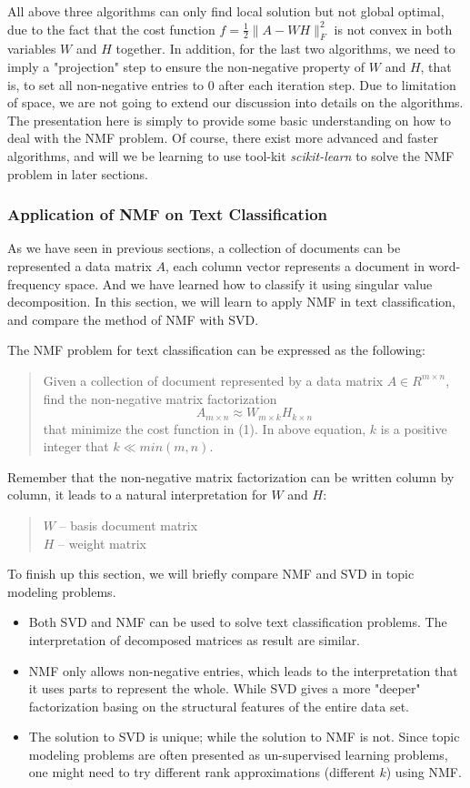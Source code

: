 \documentclass[12pt,letterpaper]{article}
\begin{document}
All above three algorithms can only find local solution but not global optimal, due to the fact that the cost function $f = \frac{1}{2} \|A - WH\|_F^2$ is not convex in both variables $W$ and $H$ together. In addition, for the last two algorithms, we need to imply a "projection" step to ensure the non-negative property of $W$ and $H$, that is, to set all non-negative entries to 0 after each iteration step. Due to limitation of space, we are not going to extend our discussion into details on the algorithms. The presentation here is simply to provide some basic understanding on how to deal with the NMF problem. Of course, there exist more advanced and faster algorithms, and will we be learning to use tool-kit \textit{scikit-learn} to solve the NMF problem in later sections. 
\subsubsection{Application of NMF on Text Classification}
As we have seen in previous sections, a collection of documents can be represented a data matrix $A$, each column vector represents a document in word-frequency space. And we have learned how to classify it using singular value decomposition. In this section, we will learn to apply NMF in text classification, and compare the method of NMF with SVD. 

The NMF problem for text classification can be expressed as the following: 
\begin{quotation}
	\noindent Given a collection of document represented by a data matrix $A \in R^{m\times n}$, find the non-negative matrix factorization
	\begin{equation}
	A_{m\times n} \approx W_{m\times k} H_{k\times n}
	\end{equation}
	that minimize the cost function in (1). In above equation, $k$ is a positive integer that $k \ll min(m, n)$. 
\end{quotation}

Remember that the non-negative matrix factorization can be written column by column, it leads to a natural interpretation for $W$ and $H$:
\begin{quotation}
	\noindent $W$ -- basis document matrix \\
	$H$ -- weight matrix
\end{quotation}

To finish up this section, we will briefly compare NMF and SVD in topic modeling problems. 
\begin{itemize}
	\item Both SVD and NMF can be used to solve text classification problems. The interpretation of decomposed matrices as result are similar. 
	\item NMF only allows non-negative entries, which leads to the interpretation that it uses parts to represent the whole. While SVD gives a more "deeper" factorization basing on the structural features of the entire data set. 
	\item The solution to SVD is unique; while the solution to NMF is not. Since topic modeling problems are often presented as un-supervised learning problems, one might need to try different rank approximations (different $k$) using NMF. 
\end{itemize}
\end{document}
